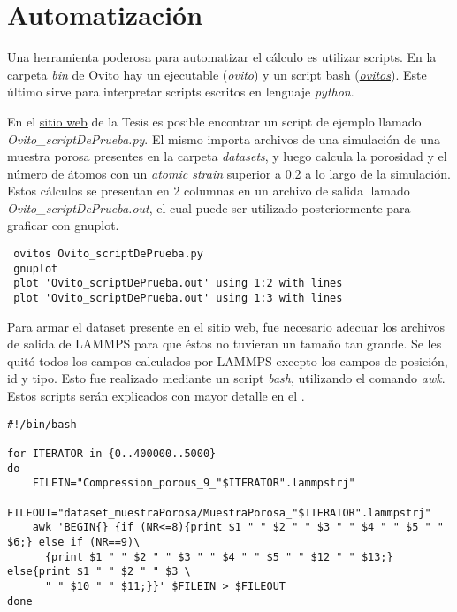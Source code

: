 \section{Automatización}
\label{AB_3}

Una herramienta poderosa para automatizar el cálculo es utilizar scripts. En la carpeta \textit{bin} de Ovito hay un ejecutable (\textit{ovito}) y un script bash (\textit{\href{http://www.ovito.org/manual/python/introduction/running.html}{ovitos}}). Este último sirve para interpretar scripts escritos en lenguaje \textit{python}. 

En el \href{https://github.com/francoa/Tesis/tree/master/Resources}{sitio web} de la Tesis es posible encontrar un script de ejemplo llamado \textit{Ovito\_scriptDePrueba.py}. El mismo importa archivos de una simulación de una muestra porosa presentes en la carpeta \textit{datasets}, y luego calcula la porosidad y el número de átomos con un \textit{atomic strain} superior a 0.2 a lo largo de la simulación. Estos cálculos se presentan en 2 columnas en un archivo de salida llamado \textit{Ovito\_scriptDePrueba.out}, el cual puede ser utilizado posteriormente para graficar con gnuplot.

\begin{lstlisting}
 ovitos Ovito_scriptDePrueba.py
 gnuplot
 plot 'Ovito_scriptDePrueba.out' using 1:2 with lines
 plot 'Ovito_scriptDePrueba.out' using 1:3 with lines
\end{lstlisting}

Para armar el dataset presente en el sitio web, fue necesario adecuar los archivos de salida de LAMMPS para que éstos no tuvieran un tamaño tan grande. Se les quitó todos los campos calculados por LAMMPS excepto los campos de posición, id y tipo. Esto fue realizado mediante un script \textit{bash}, utilizando el comando \textit{awk}. Estos scripts serán explicados con mayor detalle en el .

\begin{lstlisting}
#!/bin/bash

for ITERATOR in {0..400000..5000}
do
	FILEIN="Compression_porous_9_"$ITERATOR".lammpstrj"
	FILEOUT="dataset_muestraPorosa/MuestraPorosa_"$ITERATOR".lammpstrj"
	awk 'BEGIN{} {if (NR<=8){print $1 " " $2 " " $3 " " $4 " " $5 " " $6;} else if (NR==9)\
	  {print $1 " " $2 " " $3 " " $4 " " $5 " " $12 " " $13;} else{print $1 " " $2 " " $3 \
	  " " $10 " " $11;}}' $FILEIN > $FILEOUT
done
\end{lstlisting}

